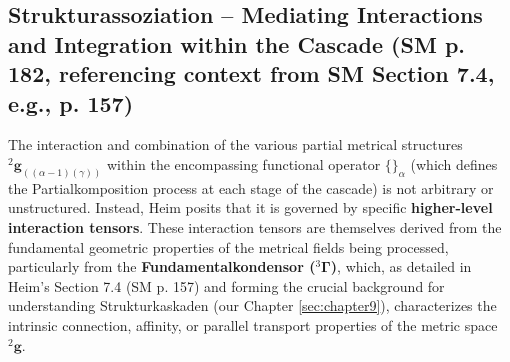 \documentclass[
    12pt,              %
    a4paper,           %
    headings=normal,   %
    twoside=true,      %
    BCOR=8mm,          %
]{scrbook}
\newcommand{\kompositionsfeld}{{}^2\mathbf{g}}
\newcommand{\partialstruktur}[1]{{}^2\mathbf{g}_{(#1)}}
\newcommand{\fundamentalkondensor}{{}^3\bm{\Gamma}}
\begin{document}
\subsection{Strukturassoziation – Mediating Interactions and Integration within the Cascade (SM p. 182, referencing context from SM Section 7.4, e.g., p. 157)}
\label{sec:ch9_1_4_strukturassoziation}
The interaction and combination of the various partial metrical structures \(\partialstruktur{(\alpha-1)(\gamma)}\) within the encompassing functional operator \(\{\}_\alpha\) (which defines the Partialkomposition process at each stage of the cascade) is not arbitrary or unstructured. Instead, Heim posits that it is governed by specific \textbf{higher-level interaction tensors}. These interaction tensors are themselves derived from the fundamental geometric properties of the metrical fields being processed, particularly from the \textbf{Fundamentalkondensor (\(\fundamentalkondensor\))}, which, as detailed in Heim’s Section 7.4 (SM p. 157) and forming the crucial background for understanding Strukturkaskaden (our Chapter \ref{sec:chapter9}), characterizes the intrinsic connection, affinity, or parallel transport properties of the metric space \(\kompositionsfeld\).
\end{document}

